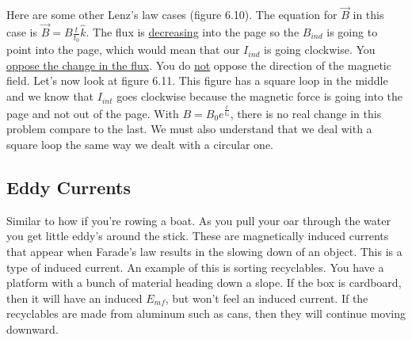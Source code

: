     Here are some other Lenz's law cases (figure 6.10). The equation for $\vec{B}$ in this case is $\vec{B}=B\frac{t}{t_0}\hat{k}$. The flux is \underline{decreasing} into the page so the $B_{ind}$ is going to point into the page, which would mean that our $I_{ind}$ is going clockwise. You \underline{oppose the change in the flux}. You do \underline{not} oppose the direction of the magnetic field.\newline\newline
    Let's now look at figure 6.11. This figure has a square loop in the middle and we know that $I_{int}$ goes clockwise because the magnetic force is going into the page and not out of the page. With $B=B_0e^\frac{t}{t_0}$, there is no real change in this problem compare to the last. We must also understand that we deal with a square loop the same way we dealt with a circular 
    one.


    \subsection{Eddy Currents}
    Similar to how if you're rowing a boat. As you pull your oar through the water you get little eddy's around the stick. These are magnetically induced currents that appear when Farade's law results in the slowing down of an object. This is a type of induced current. An example of this is sorting recyclables. You have a platform with a bunch of material heading down a slope. If the box is cardboard, then it will have an induced $E_{mf}$, but won't feel an induced current. If the recyclables are made from aluminum such as cans, then they will continue moving downward.
